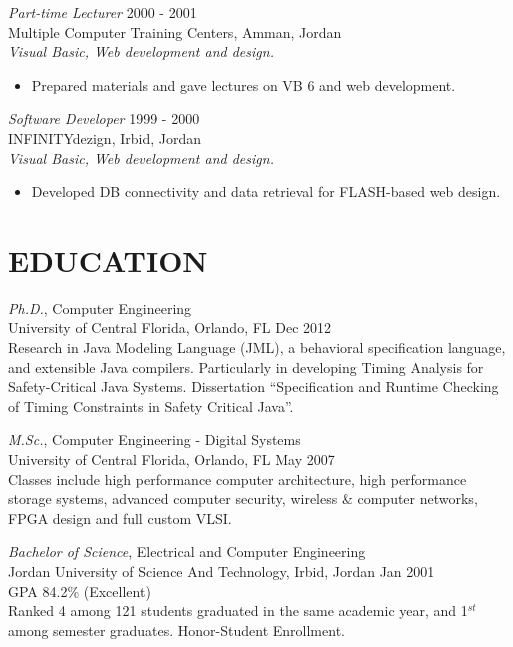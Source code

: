 \documentclass[line,margin]{res}
\begin{document}
\begin{resume}
{\sl Part-time Lecturer} \hfill   2000 - 2001 \\
Multiple Computer Training Centers, Amman, Jordan \\
\textit{Visual Basic, Web development and design.}
\begin{itemize} \itemsep -2pt
     \item Prepared materials and gave lectures on VB 6 and web development.
\end{itemize}

{\sl Software Developer} \hfill   1999 - 2000 \\
INFINITYdezign, Irbid, Jordan \\
\textit{Visual Basic, Web development and design.}
\begin{itemize} \itemsep -2pt
     \item Developed DB connectivity and data retrieval for FLASH-based web
     design.
\end{itemize}

\section{EDUCATION}
{\sl Ph.D.}, Computer Engineering \\
University of Central Florida, Orlando, FL \hfill
Dec 2012 \vspace{0.05in} \\
Research in Java Modeling Language (JML), a behavioral specification language,
and extensible Java compilers. Particularly in developing Timing Analysis
for Safety-Critical Java Systems. Dissertation ``Specification and Runtime
Checking of Timing Constraints in Safety Critical Java''.

{\sl M.Sc.}, Computer Engineering - Digital Systems \\
University of Central Florida, Orlando, FL \hspace{0.2in}  \hfill
May 2007 \vspace{0.05in} \\
Classes include high performance computer architecture, high performance
storage systems, advanced computer security, wireless \& computer networks, FPGA
design and full custom VLSI.

{\sl Bachelor of Science}, Electrical and Computer Engineering \\
Jordan University of Science And Technology, Irbid, Jordan       \hfill    Jan
2001 \vspace{0.05in} \\
GPA 84.2\% (Excellent) \\
Ranked 4 among 121 students graduated in the same academic year, and 1$^{st}$
among semester graduates. Honor-Student Enrollment.


\end{resume}
\end{document}
